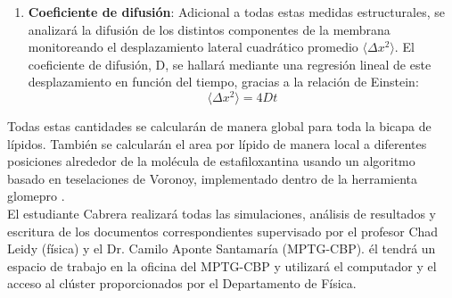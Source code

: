 \begin{enumerate}
\item \textbf{Coeficiente de difusi\'{o}n}: 
Adicional a todas estas medidas estructurales, se analizar\'{a} la difusi\'{o}n de los distintos componentes de la membrana monitoreando el desplazamiento lateral cuadr\'{a}tico promedio $\langle\Delta x^2\rangle$. El coeficiente de difusi\'{o}n, D, se hallar\'{a} mediante una regresi\'{o}n lineal de este desplazamiento en funci\'{o}n del tiempo, gracias a la relaci\'{o}n de Einstein:
\begin{equation}
\langle\Delta x^2\rangle= 4Dt
 \end{equation}
\end{enumerate}
Todas estas cantidades se calcular\'{a}n de manera global para toda la bicapa de l\'{i}pidos. Tambi\'{e}n se calcular\'{a}n el area por l\'{i}pido de manera local a diferentes posiciones alrededor de la mol\'{e}cula de estafiloxantina usando un algoritmo basado en teselaciones de Voronoy, implementado dentro de la herramienta glomepro \cite{MelendezDelgado2018StudyingBilayers}.\\

El estudiante Cabrera realizar\'{a} todas las simulaciones, an\'{a}lisis de resultados y escritura de los documentos correspondientes supervisado por el profesor Chad Leidy (f\'{i}sica) y el Dr. Camilo Aponte Santamar\'{i}a (MPTG-CBP). \'{e}l tendr\'{a} un espacio de trabajo en la oficina del MPTG-CBP y utilizar\'{a} el computador y el acceso al cl\'{u}ster proporcionados por el Departamento de F\'{i}sica.